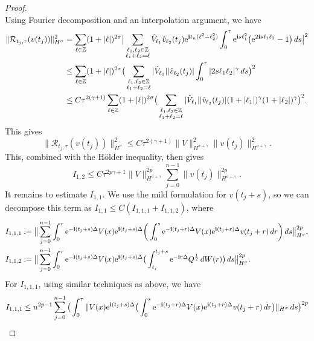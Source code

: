 \documentclass[a4paper]{amsart}
\begin{document}
\begin{proof}
$$$$
Using Fourier decomposition and an interpolation argument, we have
\begin{align*}
    \|\mathcal{R}_{t_j,\tau}(v(t_j))\|^2_{H^\sigma}&=\displaystyle\sum_{\ell\in\mathbb{Z}}(1+|\ell|)^{2\sigma}\big|\displaystyle\sum_{\substack{\ell_1,\ell_2\in\mathbb{Z}\\ \ell_1+\ell_2=\ell}}\hat{V}_{\ell_1}\hat{v}_{\ell_2}(t_j){\rm e}^{{\bf i}t_n(\ell^2-\ell_2^2)}\int_{0}^{\tau}{\rm e}^{{\bf i}s \ell_1^2}\big({\rm e}^{2{\bf i}s \ell_1 \ell_2}-1\big)\,ds\big|^2\\
    &\le \displaystyle\sum_{\ell\in\mathbb{Z}}(1+|\ell|)^{2\sigma}\big(\displaystyle\sum_{\substack{\ell_1,\ell_2\in\mathbb{Z}\\ \ell_1+\ell_2=\ell}}|\hat{V}_{\ell_1}| |\hat{v}_{\ell_2}(t_j)|\int_{0}^{\tau}|2s\ell_1 \ell_2|^\gamma\,ds\big)^2\\
    &\le C \tau^{2(\gamma+1)} \displaystyle\sum_{\ell\in\mathbb{Z}}(1+|\ell|)^{2\sigma}\big(\sum_{\substack{\ell_1,\ell_2\in\mathbb{Z}\\ \ell_1+\ell_2=\ell}}|\hat{V}_{\ell_1}| |\hat{v}_{\ell_2}(t_j)|(1+|\ell_1|)^\gamma(1+|\ell_2|)^\gamma\big)^2.
\end{align*}
This gives
$$
 \|\mathcal{R}_{t_j,\tau}(v(t_j))\|^2_{H^\sigma}\le C\tau^{2(\gamma+1)}\|V\|^2_{H^{\sigma+\gamma}}\|v(t_j)\|^2_{H^{\sigma+\gamma}}.
$$
This, combined with the Hölder inequality, then gives
$$
I_{1,2}\le C \tau^{2p\gamma+1}\|V\|^{2p}_{H^{\sigma+\gamma}}\displaystyle\sum_{j=0}^{n-1}\|v(t_j)\|^{2p}_{H^{\sigma+\gamma}}.
$$
It remains to estimate $I_{1,1}$. We use the mild formulation for $v(t_j+s)$, so we can decompose this term as $I_{1,1}\le C( I_{1,1,1}+I_{1,1,2})$, where
\begin{align*}
  &  I_{1,1,1}:=\big\|\displaystyle\sum_{j=0}^{n-1}\int_{0}^{\tau}{\rm e}^{-{\bf i}(t_j+s)\Delta} V(x){\rm e}^{{\bf i}(t_j+s)\Delta}\bigg(\int_{0}^{s}{\rm e}^{-{\bf i}(t_j+r)\Delta}V(x){\rm e}^{{\bf i}(t_j+r)\Delta}v(t_j+r)\,dr\bigg)\,ds\big\|^{2p}_{H^\sigma},\\
    &I_{1,1,2}:=\big\|\displaystyle\sum_{j=0}^{n-1}\int_{0}^{\tau}{\rm e}^{-{\bf i}(t_j+s)\Delta} V(x){\rm e}^{{\bf i}(t_j+s)\Delta}\big(\int_{t_j}^{t_j+s}{\rm e}^{-{\bf i}r \Delta}Q^{\frac{1}{2}}\,dW(r)\big)\,ds\big\|^{2p}_{H^\sigma}.
\end{align*}
For $I_{1,1,1}$, using similar techniques as above, we have
\begin{align*}
I_{1,1,1}&\le n^{2p-1}\displaystyle\sum_{j=0}^{n-1}\big(\int_0^\tau \|V(x){\rm e}^{{\bf i}(t_j+s)\Delta}\big(\int_{0}^{s}{\rm e}^{-{\bf i}(t_j+r)\Delta}V(x){\rm e}^{{\bf i}(t_j+r)\Delta}v(t_j+r)\,dr\big)\|_{H^\sigma}\,ds \big)^{2p}\\

\end{align*}
\end{proof}
\end{document}
